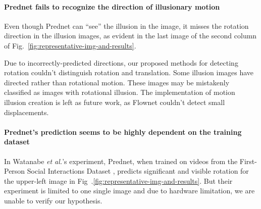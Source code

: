 \documentclass[journal]{IEEEtran}
\begin{document}
  \paragraph{Prednet fails to recognize the direction of illusionary motion} Even though Prednet can ``see'' the illusion in the image, it misses the rotation direction in the illusion images, as evident in the last image of the second column of Fig.~\ref{fig:representative-img-and-results}.
  
  Due to incorrectly-predicted directions, our proposed methods for detecting rotation couldn't distinguish rotation and translation. Some illusion images have directed rather than rotational motion. These images may be mistakenly classified as images with rotational illusion. The implementation of motion illusion creation is left as future work, as Flownet couldn't detect small displacements.

  \paragraph{Prednet's prediction seems to be highly dependent on the training dataset} In Watanabe \textit{et al.}'s experiment, Prednet, when trained on videos from the First-Person Social Interactions Dataset \cite{fathi2012social}, predicts significant and visible rotation for the upper-left image in Fig~.\ref{fig:representative-img-and-results}. But their experiment is limited to one single image and due to hardware limitation, we are unable to verify our hypothesis.
  
\end{document}
